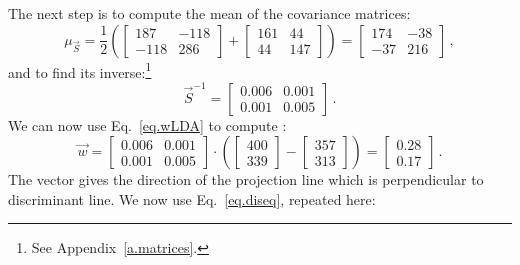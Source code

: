 The next step is to compute the mean of the covariance matrices:
\[
\mu_{\vec{S}} = 
\frac{1}{2}\left(\left[ \begin{array}{c} 187\\-118\end{array} \begin{array}{c} -118\\286 \end{array}\right]+
\left[ \begin{array}{c} 161\\44\end{array} \begin{array}{c} 44\\147 \end{array}\right]\right) = 
\left[ \begin{array}{c} 174\\-37\end{array} \begin{array}{c} -38\\216 \end{array}\right]\,,
\]
and to find its inverse:\footnote{See Appendix~\ref{a.matrices}.}
\[
\vec{S}^{-1} = \left[ \begin{array}{c} 0.006\\0.001\end{array} \begin{array}{c} 0.001\\0.005 \end{array}\right]\,.
\]
We can now use Eq.~\ref{eq.wLDA} to compute :
\[
\vec{w} = \left[ \begin{array}{c} 0.006\\0.001\end{array} \begin{array}{c} 0.001\\0.005 \end{array}\right] \cdot \left( \left[ \begin{array}{c} 400\\339 \end{array}\right] - \left[ \begin{array}{c} 357\\313 \end{array} \right] \right) = \left[ \begin{array}{c} 0.28\\0.17 \end{array} \right]\,.
\]
The vector  gives the direction of the projection line which is perpendicular to discriminant line. We now use Eq.~\ref{eq.diseq}, repeated here:
